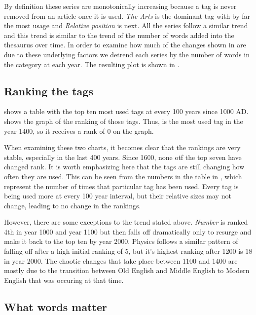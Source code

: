 By definition these series are monotonically increasing because a tag is never removed from an article once it is used.
\textit{The Arts} is the dominant tag with by far the most usage and \textit{Relative position} is next.
All the series follow a similar trend and this trend is similar to the trend of the number of words added into the thesaurus over time.
In order to examine how much of the changes shown in  are due to these underlying factors we detrend each series by the number of words in the category at each year.
The resulting plot is shown in .


\subsection{Ranking the tags}

 shows a table with the top ten most used tags at every 100 years since 1000 AD.
 shows the graph of the ranking of those tags.
Thus,  is the most used tag in the year 1400, so it receives a rank of $0$ on the graph.

When examining these two charts, it becomes clear that the rankings are very stable, especially in the last 400 years.
Since 1600, none otf the top seven have changed rank.
It is worth emphasizing here that the tags are still changing how often they are used.
This can be seen from the numbers in the table in , which represent the number of times that particular tag has been used.
Every tag is being used more at every 100 year interval, but their relative sizes may not change, leading to no change in the rankings.

However, there are some exceptions to the trend stated above.
\textit{Number} is ranked 4th in year 1000 and year 1100 but then falls off dramatically only to resurge and make it back to the top ten by year 2000.
Physics follows a similar pattern of falling off after a high initial ranking of $5$, but it's highest ranking after 1200 is 18 in year 2000.
The chaotic changes that take place between 1100 and 1400 are mostly due to the transition between Old English and Middle English to Modern English that was occuring at that time. 

\subsection{What words matter}




